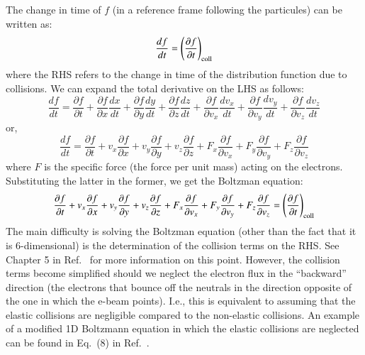\documentclass{warpdoc}
\begin{document}
The change in time of $f$ (in a reference frame following the particules) can be written as:
%
\begin{equation}
  \frac{d f}{d t} = \left(\frac{\partial f}{\partial t}  \right)_{\rm coll}
\end{equation}
%
where the RHS refers to the change in time of the distribution function due to collisions. We can expand the total derivative on the LHS as follows:
%
\begin{equation}
  \frac{d f}{d t} = \frac{\partial f}{\partial t} 
                  + \frac{\partial f}{\partial x} \frac{dx }{dt} 
                  + \frac{\partial f}{\partial y} \frac{dy }{dt} 
                  + \frac{\partial f}{\partial z} \frac{dz }{dt} 
                  + \frac{\partial f}{\partial v_x} \frac{d v_x }{dt} 
                  + \frac{\partial f}{\partial v_y} \frac{d v_y }{dt} 
                  + \frac{\partial f}{\partial v_z} \frac{d v_z }{dt} 
\end{equation}
%
or,
%
\begin{equation}
  \frac{d f}{d t} = \frac{\partial f}{\partial t} 
                  + v_x \frac{\partial f}{\partial x}  
                  + v_y \frac{\partial f}{\partial y}  
                  + v_z \frac{\partial f}{\partial z}  
                  + F_x \frac{\partial f}{\partial v_x}  
                  + F_y \frac{\partial f}{\partial v_y}  
                  + F_z \frac{\partial f}{\partial v_z}  
\end{equation}
%
where $F$ is the specific force (the force per unit mass) acting on the electrons. Substituting the latter in the former, we get the Boltzman equation:
%
\begin{equation}
  \frac{\partial f}{\partial t} 
                  + v_x \frac{\partial f}{\partial x}  
                  + v_y \frac{\partial f}{\partial y}  
                  + v_z \frac{\partial f}{\partial z}  
                  + F_x \frac{\partial f}{\partial v_x}  
                  + F_y \frac{\partial f}{\partial v_y}  
                  + F_z \frac{\partial f}{\partial v_z} 
 = \left(\frac{\partial f}{\partial t}  \right)_{\rm coll}
\label{eqn:boltzman}
\end{equation}
%
The main difficulty is solving the Boltzman equation (other than the fact that it is 6-dimensional) is the determination of the collision terms on the RHS. See Chapter 5 in Ref.\ \cite{book:1991:raizer} for more information on this point. However, the collision terms become simplified should we neglect the electron flux in the ``backward'' direction (the electrons that bounce off the neutrals in the direction opposite of the one in which the e-beam points). I.e., this is equivalent to assuming that the elastic collisions are negligible compared to the non-elastic collisions. An example of a modified 1D Boltzmann equation in which the elastic collisions are neglected can be found in Eq.\ (8) in Ref.\ \cite{tvt:1989:raizer}.    





\end{document}
